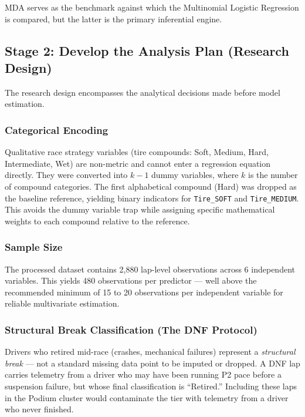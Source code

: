 MDA serves as the benchmark against which the Multinomial Logistic Regression
is compared, but the latter is the primary inferential engine.

\subsection{Stage 2: Develop the Analysis Plan (Research Design)}

The research design encompasses the analytical decisions made before model
estimation.

\subsubsection{Categorical Encoding}

Qualitative race strategy variables (tire compounds: Soft, Medium, Hard,
Intermediate, Wet) are non-metric and cannot enter a regression equation
directly. They were converted into $k{-}1$ dummy variables, where $k$ is the
number of compound categories. The first alphabetical compound (Hard) was
dropped as the baseline reference, yielding binary indicators for
\texttt{Tire\_SOFT} and \texttt{Tire\_MEDIUM}. This avoids the dummy variable
trap while assigning specific mathematical weights to each compound relative
to the reference.

\subsubsection{Sample Size}

The processed dataset contains 2,880 lap-level observations across 6
independent variables. This yields 480 observations per predictor --- well
above the recommended minimum of 15 to 20 observations per independent
variable for reliable multivariate estimation\parencite{hair2019}.

\subsubsection{Structural Break Classification (The DNF Protocol)}

Drivers who retired mid-race (crashes, mechanical failures) represent a
\textit{structural break} --- not a standard missing data point to be
imputed or dropped. A DNF lap carries telemetry from a driver who may have
been running P2 pace before a suspension failure, but whose final
classification is ``Retired.'' Including these laps in the Podium cluster
would contaminate the tier with telemetry from a driver who never finished.


